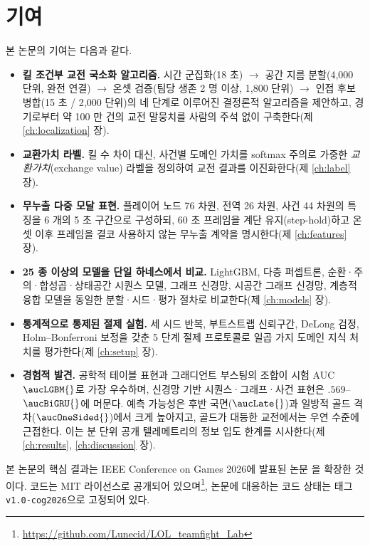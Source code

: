 
\section{기여}
\label{sec:intro-contrib}

본 논문의 기여는 다음과 같다.

\begin{itemize}[leftmargin=1.5em]
  \item \textbf{킬 조건부 교전 국소화 알고리즘.} 시간 군집화(18 초) $\to$ 공간 지름 분할(4{,}000 단위, 완전 연결) $\to$ 온셋 검증(팀당 생존 2 명 이상, 1{,}800 단위) $\to$ 인접 후보 병합(15 초 / 2{,}000 단위)의 네 단계로 이루어진 결정론적 알고리즘을 제안하고, \numMatches{} 경기로부터 약 100 만 건의 교전 말뭉치를 사람의 주석 없이 구축한다(제 \ref{ch:localization} 장).
  \item \textbf{교환가치 라벨.} 킬 수 차이 대신, 사건별 도메인 가치를 softmax 주의로 가중한 \emph{교환가치}(exchange value) 라벨을 정의하여 교전 결과를 이진화한다(제 \ref{ch:label} 장).
  \item \textbf{무누출 다중 모달 표현.} 플레이어 노드 76 차원, 전역 26 차원, 사건 44 차원의 특징을 6 개의 5 초 구간으로 구성하되, 60 초 프레임을 계단 유지(step-hold)하고 온셋 이후 프레임을 결코 사용하지 않는 무누출 계약을 명시한다(제 \ref{ch:features} 장).
  \item \textbf{25 종 이상의 모델을 단일 하네스에서 비교.} LightGBM, 다층 퍼셉트론, 순환·주의·합성곱·상태공간 시퀀스 모델, 그래프 신경망, 시공간 그래프 신경망, 계층적 융합 모델을 동일한 분할·시드·평가 절차로 비교한다(제 \ref{ch:models} 장).
  \item \textbf{통계적으로 통제된 절제 실험.} 세 시드 반복, 부트스트랩 신뢰구간, DeLong 검정, Holm--Bonferroni 보정을 갖춘 5 단계 절제 프로토콜로 일곱 가지 도메인 지식 처치를 평가한다(제 \ref{ch:setup} 장).
  \item \textbf{경험적 발견.} 공학적 테이블 표현과 그래디언트 부스팅의 조합이 시험 AUC $\aucLGBM{}$로 가장 우수하며, 신경망 기반 시퀀스·그래프·사건 표현은 $.569$--$\aucBiGRU{}$에 머문다. 예측 가능성은 후반 국면($\aucLate{}$)과 일방적 골드 격차($\aucOneSided{}$)에서 크게 높아지고, 골드가 대등한 교전에서는 우연 수준에 근접한다. 이는 분 단위 공개 텔레메트리의 정보 입도 한계를 시사한다(제 \ref{ch:results}, \ref{ch:discussion} 장).
\end{itemize}

본 논문의 핵심 결과는 IEEE Conference on Games 2026에 발표된 논문 \cite{baek2026killconditioned}을 확장한 것이다. 코드는 MIT 라이선스로 공개되어 있으며\footnote{\url{https://github.com/Lunecid/LOL_teamfight_Lab}}, 논문에 대응하는 코드 상태는 태그 \texttt{v1.0-cog2026}으로 고정되어 있다.
